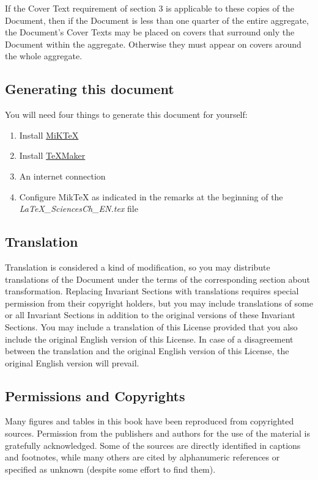 	If the Cover Text requirement of section 3 is applicable to these copies of the Document, then if the Document is less than one quarter of the entire aggregate, the Document's Cover Texts may be placed on covers that surround only the Document within the aggregate. Otherwise they must appear on covers around the whole aggregate. 
	
	\subsection{Generating this document}
	You will need four things to generate this document for yourself:
	\begin{enumerate}
		\item Install \href{https://miktex.org/}{MiKTeX}

		\item Install \href{http://www.xm1math.net/texmaker/index_fr.html}{TeXMaker}

		\item An internet connection

		\item Configure MikTeX as indicated in the remarks at the beginning of the \textit{LaTeX\_SciencesCh\_EN.tex} file
	\end{enumerate}

	\subsection{Translation}
	Translation is considered a kind of modification, so you may distribute translations of the Document under the terms of the corresponding section about transformation. Replacing Invariant Sections with translations requires special permission from their copyright holders, but you may include translations of some or all Invariant Sections in addition to the original versions of these Invariant Sections. You may include a translation of this License provided that you also include the original English version of this License. In case of a disagreement between the translation and the original English version of this License, the original English version will prevail. 
	
	\subsection{Permissions and Copyrights}
	Many figures and tables in this book have been reproduced from copyrighted sources. Permission from the publishers and authors for the use of the material is gratefully acknowledged. Some of the sources are directly identified in captions and footnotes, while many others are cited by alphanumeric references or specified as unknown (despite some effort to find them).

